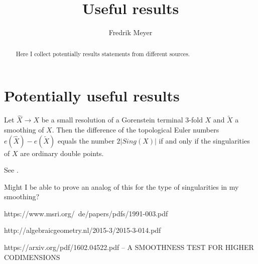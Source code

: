 \documentclass[11pt, english]{article}
\begin{document}
\title{Useful results}
\author{Fredrik Meyer}
\maketitle 

\begin{abstract}
 Here I collect potentially results statements from different sources.
\end{abstract}

\section{Potentially useful results}

\begin{prop}
Let $\widehat X \to X$ be a small resolution of a Gorenstein terminal 3-fold $X$ and $\widetilde X$ a smoothing of $X$. Then the difference of the topological Euler numbers $e(\widehat X) - e(\widetilde X)$ equals the number $2\lvert Sing(X) \rvert$ if and only if the singularities of $X$ are ordinary double points.
\end{prop}
See \cite{wang_connectedness}.

Might I be able to prove an analog of this for the type of singularities in my smoothing?


https://www.msri.org/~de/papers/pdfs/1991-003.pdf

http://algebraicgeometry.nl/2015-3/2015-3-014.pdf

https://arxiv.org/pdf/1602.04522.pdf -- A SMOOTHNESS TEST FOR HIGHER CODIMENSIONS



\end{document}
